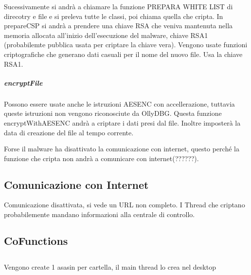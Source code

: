 \documentclass[]{article}
\begin{document}
Sucessivamente si andrà a chiamare la funzione 
PREPARA WHITE LIST di direcotry e file e si preleva tutte le classi, poi chiama quella che cripta. In prepareCSP si andrà a prendere una chiave RSA che veniva mantenuta nella memoria allocata all'inizio dell'esecuzione del malware, chiave RSA1 (probabilemte pubblica usata per criptare la chiave vera). Vengono usate funzioni criptografiche che generano dati casuali per il nome del nuovo file. Usa la chiave RSA1. 

\subparagraph{encryptFile}
Possono essere usate anche le istruzioni AESENC con accellerazione, tuttavia queste istruzioni non vengono riconosciute da OllyDBG. Questa funzione encryptWithAESENC andrà a criptare i dati presi dal file. Inoltre imposterà la data di creazione del file al tempo corrente.

Forse il malware ha disattivato la comunicazione con internet, questo perché la funzione che cripta non andrà a comunicare con internet(??????).

\subsection{Comunicazione con Internet}
Comunicazione disattivata, si vede un URL non completo. I Thread che criptano probabilemente mandano informazioni alla centrale di controllo.

\subsection{CoFunctions}


\subsection{}
Vengono create 1 asasin per cartella, il main thread lo crea nel desktop
\end{document}
